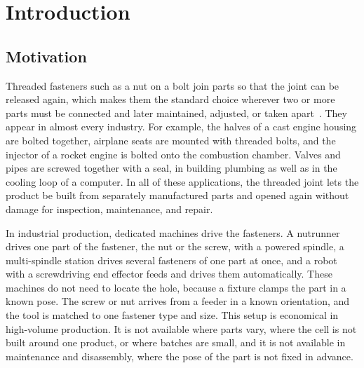 \chapter{Introduction}\label{ch:introduction}%

\section{Motivation}\label{sec:motivation}

Threaded fasteners such as a nut on a bolt join parts so that the joint can be released again, which makes them the standard choice wherever two or more parts must be connected and later maintained, adjusted, or taken apart~\cite{Budynas2020,Niemann2019}. They appear in almost every industry. For example, the halves of a cast engine housing are bolted together, airplane seats are mounted with threaded bolts, and the injector of a rocket engine is bolted onto the combustion chamber. Valves and pipes are screwed together with a seal, in building plumbing as well as in the cooling loop of a computer.
In all of these applications, the threaded joint lets the product be built from separately manufactured parts and opened again without damage for inspection, maintenance, and repair.

In industrial production, dedicated machines drive the fasteners. A nutrunner drives one part of the fastener, the nut or the screw, with a powered spindle, a multi-spindle station drives several fasteners of one part at once, and a robot with a screwdriving end effector feeds and drives them automatically.
These machines do not need to locate the hole, because a fixture clamps the part in a known pose. The screw or nut arrives from a feeder in a known orientation, and the tool is matched to one fastener type and size.
This setup is economical in high-volume production. It is not available where parts vary, where the cell is not built around one product, or where batches are small, and it is not available in maintenance and disassembly, where the pose of the part is not fixed in advance.

